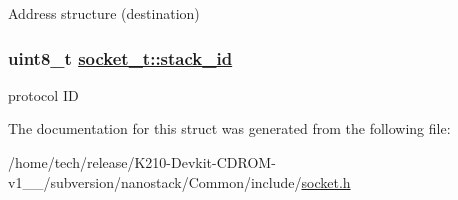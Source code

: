 Address structure (destination) \hypertarget{structsocket__t_ac1f42ef7ee07bed7f96631b4752dabb}{
\subsubsection[stack\_\-id]{\setlength{\rightskip}{0pt plus 5cm}uint8\_\-t \hyperlink{structsocket__t_ac1f42ef7ee07bed7f96631b4752dabb}{socket\_\-t::stack\_\-id}}}
\label{structsocket__t_ac1f42ef7ee07bed7f96631b4752dabb}


protocol ID 

The documentation for this struct was generated from the following file:\begin{CompactItemize}
\item 
/home/tech/release/K210-Devkit-CDROM-v1\_\_/subversion/nanostack/Common/include/\hyperlink{socket_8h}{socket.h}\end{CompactItemize}
